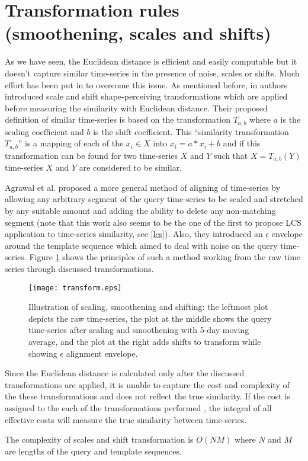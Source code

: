 \section{Transformation rules (smoothening, scales and shifts)} \label{scales_and_shifts}
As we have seen, the Euclidean distance is efficient and easily computable but it doesn't capture similar time-series in the presence of noise, scales or shifts. Much effort has been put in to overcome this issue. As mentioned before, in \cite{citeulike:3815880} authors introduced scale and shift shape-perceiving transformations which are applied before measuring the similarity with Euclidean distance. Their proposed definition of similar time-series is based on the transformation $T_{a,b}$ where $a$ is the scaling coefficient and $b$ is the shift coefficient. This ``similarity transformation $T_{a,b}$'' is a mapping of each of the $x_{i} \in X$ into $x_{i}\acute{} = a*x_{i}+b$ and if this transformation can be found for two time-series $X$ and $Y$ such that $X=T_{a,b}(Y)$ time-series $X$ and $Y$ are considered to be similar.

Agrawal et al. \cite{citeulike:3816327} proposed a more general method of aligning of time-series by allowing any arbitrary segment of the query time-series to be scaled and stretched by any suitable amount and adding the ability to delete any non-matching segment (note that this work also seems to be the one of the first to propose LCS application to time-series similarity, see \ref{lcs}). Also, they introduced an $\epsilon$ envelope around the template sequence which aimed to deal with noise on the query time-series. Figure  \ref{fig:transform} shows the principles of such a method working from the raw time series through discussed transformations.

\begin{figure}[tbp]
   \centering
   \texttt{[image: transform.eps]}
   \caption{Illustration of scaling, smoothening and shifting: the leftmost plot depicts the raw time-series, the plot at the middle shows the query time-series after scaling and smoothening with 5-day moving average, and the plot at the right adds shifts to transform while showing $\epsilon$ alignment envelope.}
   \label{fig:transform}
\end{figure} 

Since the Euclidean distance is calculated only after the discussed transformations are applied, it is unable to capture the cost and complexity of the these transformations and does not reflect the true similarity. If the cost is assigned to the each of the transformations performed \cite{citeulike:3731711}, the integral of all effective costs will measure the true similarity between time-series.

The complexity of scales and shift transformation is $O(NM)$ where $N$ and $M$ are lengths of the query and template sequences.

